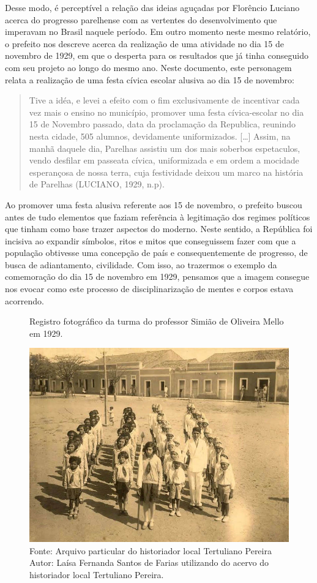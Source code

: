 \begin{refsection}
Desse modo, é perceptível a relação das ideias aguçadas por Florêncio Luciano acerca do progresso parelhense com as vertentes do desenvolvimento que imperavam no Brasil naquele período. Em outro momento neste mesmo relatório, o prefeito nos descreve acerca da realização de uma atividade no dia 15 de novembro de 1929, em que o desperta para os resultados que já tinha conseguido com seu projeto ao longo do mesmo ano. Neste documento, este personagem relata a realização de uma festa cívica escolar alusiva ao dia 15 de novembro:

\begin{quotation}
    Tive a idéa, e levei a efeito com o fim exclusivamente de incentivar cada vez mais o ensino no município, promover uma festa cívica-escolar no dia 15 de Novembro passado, data da proclamação da Republica, reunindo nesta cidade, 505 alumnos, devidamente uniformizados. [\dots] Assim, na manhã daquele dia, Parelhas assistiu um dos mais soberbos espetaculos, vendo desfilar em passeata cívica, uniformizada e em ordem a mocidade esperançosa de nossa terra, cuja festividade deixou um marco na história de Parelhas (LUCIANO, 1929, n.p).
\end{quotation}

Ao promover uma festa alusiva referente aos 15 de novembro, o prefeito buscou antes de tudo elementos que faziam referência à legitimação dos regimes políticos que tinham como base trazer aspectos do moderno. Neste sentido, a República foi incisiva ao expandir símbolos, ritos e mitos que conseguissem fazer com que a população obtivesse uma concepção de país e consequentemente de progresso, de busca de adiantamento, civilidade. Com isso, ao trazermos o exemplo da comemoração do dia 15 de novembro em 1929, pensamos que a imagem consegue nos evocar como este processo de disciplinarização de mentes e corpos estava acorrendo.

\begin{figure}[ht]%
    \centering%
    \caption{Registro fotográfico da turma do professor Simião de Oliveira Mello em 1929.}%
    \includegraphics[width=.85\textwidth]{articles/04-de-como-as-letras-fo/01-turma-professor.jpg}%
    \caption*{Fonte: Arquivo particular do historiador local Tertuliano Pereira\\
    Autor: Laísa Fernanda Santos de Farias utilizando do acervo do historiador local Tertuliano Pereira.}%
    \label{fig:turmaProfessor}%
\end{figure}%


\end{refsection}
